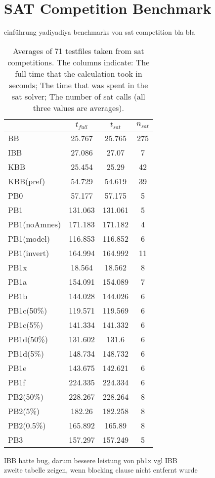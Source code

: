 \section{SAT Competition Benchmark}

einführung yadiyadiya benchmarks von sat competition bla bla

\begin{table} %
\label{tab:satCompAvg} %
\begin{tabular}{l| c c c }
 & $t_{full}$ & $t_{sat}$ & $n_{sat}$ \\
 \hline
BB & 25.767 & 25.765 & 275 \\
IBB & 27.086 & 27.07 & 7 \\
KBB & 25.454 & 25.29 & 42 \\
KBB(pref) & 54.729 & 54.619 & 39 \\
PB0 & 57.177 & 57.175 & 5 \\
PB1 & 131.063 & 131.061 & 5 \\
PB1(noAmnes) & 171.183 & 171.182 & 4 \\
PB1(model) & 116.853 & 116.852 & 6 \\
PB1(invert) & 164.994 & 164.992 & 11 \\
PB1x & 18.564 & 18.562 & 8 \\
PB1a & 154.091 & 154.089 & 7 \\
PB1b & 144.028 & 144.026 & 6 \\
PB1c(50\%) & 119.571 & 119.569 & 6 \\
PB1c(5\%) & 141.334 & 141.332 & 6 \\
PB1d(50\%) & 131.602 & 131.6 & 6 \\
PB1d(5\%) & 148.734 & 148.732 & 6 \\
PB1e & 143.675 & 142.621 & 6 \\
PB1f & 224.335 & 224.334 & 6 \\
PB2(50\%) & 228.267 & 228.264 & 8 \\
PB2(5\%) & 182.26 & 182.258 & 8 \\
PB2(0.5\%) & 165.892 & 165.89 & 8 \\
PB3 & 157.297 & 157.249 & 5
\end{tabular}
\caption{Averages of 71 testfiles taken from sat competitions. The columns indicate: The full time that the calculation took in seconds; The time that was spent in the sat solver; The number of sat calls (all three values are averages). }
\end{table}


IBB hatte bug, darum bessere leistung von pb1x vgl IBB\\
zweite tabelle zeigen, wenn blocking clause nicht entfernt wurde



